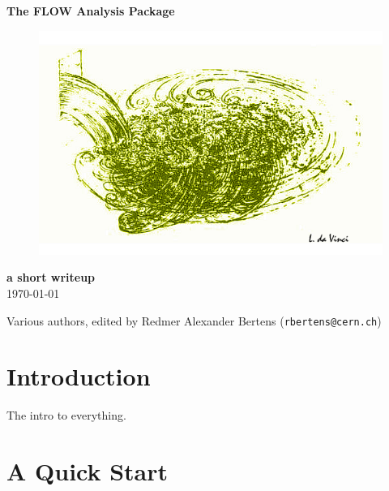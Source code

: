 \documentclass[a4paper]{book}
\numberwithin{equation}{subsection}
\renewcommand{\thefootnote}{\fnsymbol{footnote}}
\begin{document}
\noindent
\begin{center}
	\vspace*{1.5cm}
	{\LARGE \bf The FLOW Analysis Package}\\
		
	\vspace{1.5cm}
	\begin{figure}[hbt]
		\includegraphics[width=1.\textwidth]{figs/daVinci.png}
	\end{figure}
		
	\vspace{1.5cm}
	\noindent
	{\large \bf a short writeup}\\
	\today\\
\end{center}
\vfill
\noindent
Various authors, edited by Redmer Alexander Bertens (\texttt{rbertens@cern.ch})

\clearpage
\thispagestyle{empty}
\tableofcontents
\renewcommand{\thefootnote}{\alph{footnote}}
\mainmatter
\chapter{Introduction}
The intro to everything.
\chapter{A Quick Start}
\end{document}
